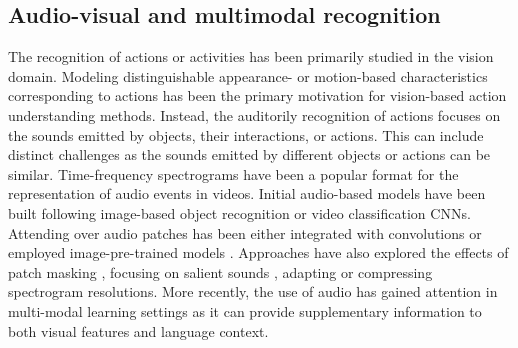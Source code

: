 \documentclass[smallextended,twocolumn,natbib]{svjour3}
\begin{document}
\subsection{Audio-visual and multimodal recognition} 

The recognition of actions or activities has been primarily studied in the vision domain. Modeling distinguishable appearance- or motion-based characteristics corresponding to actions has been the primary motivation for vision-based action understanding methods. Instead, the auditorily recognition of actions focuses on the sounds emitted by objects, their interactions, or actions. This can include distinct challenges as the sounds emitted by different objects or actions can be similar. Time-frequency spectrograms have been a popular format for the representation of audio events in videos. Initial audio-based models have been built following image-based object recognition \citep{gong2021psla} or video classification \citep{kazakos2021slow} CNNs. Attending over audio patches has been either integrated with convolutions \citep{gulati2020conformer,kong2020panns} or employed image-pre-trained models \citep{koutini2021efficient}. Approaches have also explored the effects of patch masking \citep{baade2022mae,huang2022masked}, focusing on salient sounds \citep{stergiou2023play}, adapting \citep{liu2022learning_the} or compressing \citep{feng2024coarse} spectrogram resolutions. More recently, the use of audio has gained attention in multi-modal learning settings as it can provide supplementary information to both visual features and language context.
\end{document}
